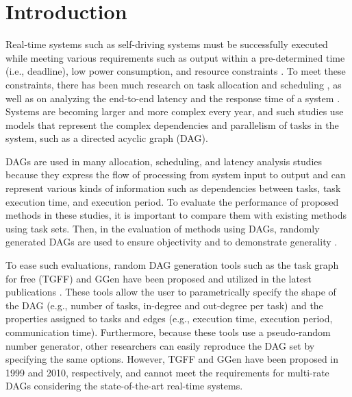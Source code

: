 \section{Introduction}
\label{sec: introduction}

Real-time systems such as self-driving systems must be successfully executed while meeting various requirements such as output within a pre-determined time (i.e., deadline), low power consumption, and resource constraints \cite{koike2021federated, senapati2021hmds, kaur2020deep}.
To meet these constraints, there has been much research on task allocation and scheduling \cite{igarashi2021accurate, asghari2020online, tong2020ql}, as well as on analyzing the end-to-end latency and the response time of a system \cite{yang2020exploring, kordon2020evaluation, chen2021partial}.
Systems are becoming larger and more complex every year, and such studies use models that represent the complex dependencies and parallelism of tasks in the system, such as a directed acyclic graph (DAG).

DAGs are used in many allocation, scheduling, and latency analysis studies \cite{choi2021picas, nguyen2019cache, klaus2021constrained} because they express the flow of processing from system input to output and can represent various kinds of information such as dependencies between tasks, task execution time, and execution period.
To evaluate the performance of proposed methods in these studies, it is important to compare them with existing methods using task sets.
Then, in the evaluation of methods using DAGs, randomly generated DAGs are used to ensure objectivity and to demonstrate generality \cite{dai2021timing, verucchi2020latency, gunzel2021suspension}.

To ease such evaluations, random DAG generation tools such as the task graph for free (TGFF) \cite{tgff} and GGen \cite{cordeiro2010random} have been proposed and utilized in the latest publications \cite{sun2021deepweave, huang2020hda, rouxel-free, cao2018affinity}.
These tools allow the user to parametrically specify the shape of the DAG (e.g., number of tasks, in-degree and out-degree per task) and the properties assigned to tasks and edges (e.g., execution time, execution period, communication time).
Furthermore, because these tools use a pseudo-random number generator, other researchers can easily reproduce the DAG set by specifying the same options.
However, TGFF and GGen have been proposed in 1999 and 2010, respectively, and cannot meet the requirements for multi-rate DAGs considering the state-of-the-art real-time systems.

